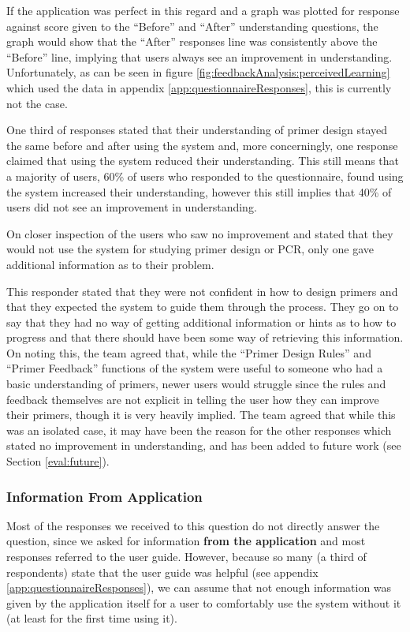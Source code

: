 If the application was perfect in this regard and a graph was plotted
for response against score given to the ``Before'' and ``After''
understanding questions, the graph would show that the ``After''
responses line was consistently above the ``Before'' line, implying
that users always see an improvement in understanding.
Unfortunately, as can be seen in figure
\ref{fig:feedbackAnalysis:perceivedLearning} which used the data in
appendix \ref{app:questionnaireResponses}, this is currently not the
case.

One third of responses stated that their understanding of primer
design stayed the same before and after using the system and, more
concerningly, one response claimed that using the system reduced their
understanding.
This still means that a majority of users, 60\% of users who responded
to the questionnaire, found using the system increased their
understanding, however this still implies that 40\% of users did not
see an improvement in understanding.

On closer inspection of the users who saw no improvement and stated
that they would not use the system for studying primer design or PCR,
only one gave additional information as to their problem.

This responder stated that they were not confident in how to design
primers and that they expected the system to guide them through the
process.
They go on to say that they had no way of getting additional
information or hints as to how to progress and that there should have
been some way of retrieving this information.
On noting this, the team agreed that, while the ``Primer Design
Rules'' and ``Primer Feedback'' functions of the system were useful to
someone who had a basic understanding of primers, newer users would
struggle since the rules and feedback themselves are not explicit
in telling the user how they can improve their primers, though it is
very heavily implied.
The team agreed that while this was an isolated case, it may have been
the reason for the other responses which stated no improvement in
understanding, and has been added to future work (see Section
\ref{eval:future}).

\subsubsection{Information From Application}
Most of the responses we received to this question do not directly
answer the question, since we asked for information \textbf{from the
  application} and most responses referred to the user guide.
However, because so many (a third of respondents) state that the user
guide was helpful (see appendix \ref{app:questionnaireResponses}), we
can assume that not enough information was given by the application
itself for a user to comfortably use the system without it (at least
for the first time using it).

